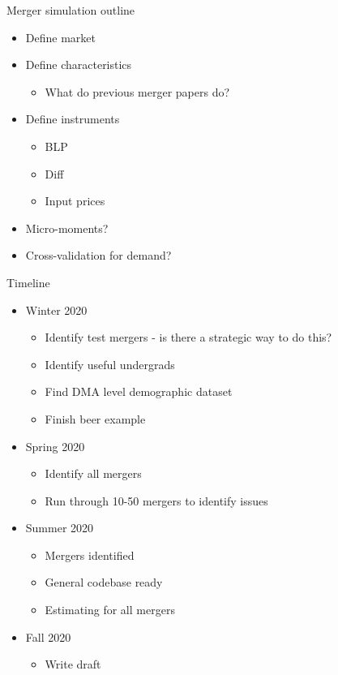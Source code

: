 

Merger simulation outline
\begin{itemize}
	\item Define market
	\item Define characteristics
	\begin{itemize}
		\item What do previous merger papers do?
	\end{itemize}	
	\item Define instruments
	\begin{itemize}
		\item BLP
		\item Diff
		\item Input prices
	\end{itemize}
	\item Micro-moments?
	\item Cross-validation for demand?
\end{itemize}

Timeline
\begin{itemize}
\item Winter 2020
	\begin{itemize}
	\item Identify test mergers - is there a strategic way to do this?
	\item Identify useful undergrads
	\item Find DMA level demographic dataset 
	\item Finish beer example
	\end{itemize}
\item Spring 2020
	\begin{itemize}
	\item Identify all mergers
	\item Run through 10-50 mergers to identify issues
	\end{itemize}
\item Summer 2020
	\begin{itemize}
	\item Mergers identified
	\item General codebase ready
	\item Estimating for all mergers
	\end{itemize}
\item Fall 2020
	\begin{itemize}
	\item Write draft
	\end{itemize}
\end{itemize}

